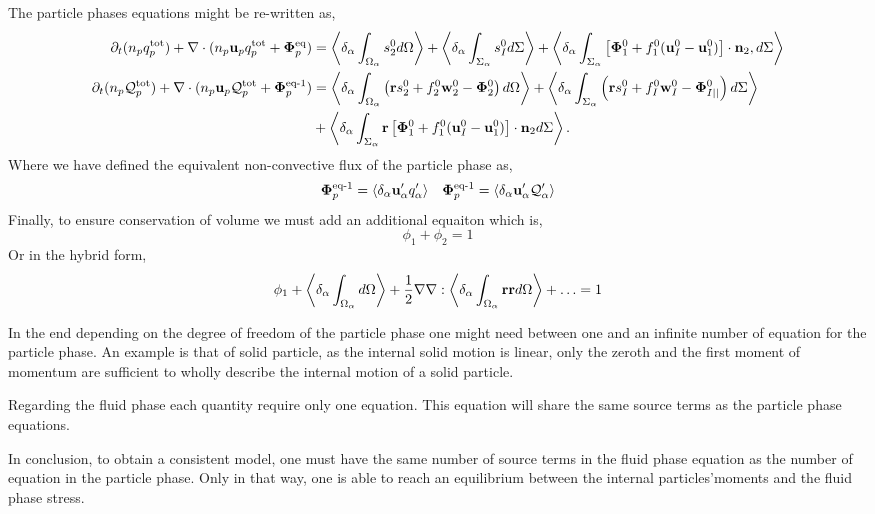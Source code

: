 The particle phases equations might be re-written as, 
\begin{align}
    \partial_t (n_p  q_p^\text{tot})
    + \mathbf{\nabla}\cdot (n_p\textbf{u}_p q_p^\text{tot} + \bm\Phi_p^\text{eq})
    &= \left<\delta_\alpha \int_{\Omega_\alpha}  s_2^0  d\Omega\right>
    + \left<\delta_\alpha \int_{\Sigma_\alpha}  s_I^0  d\Sigma\right>
    + \left<\delta_\alpha \int_{\Sigma_\alpha}  \left[\mathbf{\Phi}_1^0 + f_1^0 (\textbf{u}_I^0-\textbf{u}_1^0) \right] \cdot \textbf{n}_2 , d\Sigma\right>
    \\
    \partial_t (n_p  \mathcal{Q}_p^\text{tot})
    + \mathbf{\nabla}\cdot (n_p \textbf{u}_p\mathcal{Q}_p^\text{tot}
    + \bm\Phi_p^\text{eq-1})
    &=\left<\delta_\alpha \int_{\Omega_\alpha}  \left(
        \textbf{r} s_2^0         
        + f_2^0  \textbf{w}_2^0 
        - \mathbf{\Phi}_2^0
    \right)  d\Omega\right>
    + \left<\delta_\alpha \int_{\Sigma_\alpha}  \left(
        \textbf{r}s_I^0
        + f_I^0 \textbf{w}_I^0
        - \mathbf{\Phi}_{I||}^0
    \right)  d\Sigma\right>\nonumber\\
    &+ \left<\delta_\alpha \int_{\Sigma_\alpha}  \textbf{r} \left[
        \mathbf{\Phi}_1^0
        + f_1^0 (\textbf{u}_I^0-\textbf{u}_1^0)
    \right]\cdot \textbf{n}_2   d\Sigma\right>.
\end{align}
Where we have defined the equivalent non-convective flux of the particle phase as, 
\begin{align*}
    \bm\Phi_p^\text{eq-1}= \left<\delta_\alpha \textbf{u}_\alpha' q_\alpha'\right>
    && \bm\Phi_p^\text{eq-1}= \left<\delta_\alpha \textbf{u}_\alpha' \mathcal{Q}_\alpha'\right>
\end{align*}
Finally, to ensure conservation of volume we must add an additional equaiton which is, 
\begin{equation}
    \phi_1 + \phi_2 = 1
\end{equation}
Or in the hybrid form, 
\begin{equation}
    \phi_1 + \left<\delta_\alpha \int_{\Omega_\alpha}  d\Omega\right> +\frac{1}{2} \mathbf{\nabla}\mathbf{\nabla} : \left<\delta_\alpha \int_{\Omega_\alpha} \textbf{rr} d\Omega\right> + \ldots = 1
\end{equation}



In the end depending on the degree of freedom of the particle phase one might need between one and an infinite number of equation for the particle phase. 
An example is that of solid particle, as the internal solid motion is linear, only the zeroth and the first moment of momentum are sufficient to wholly describe the internal motion of a solid particle. 

Regarding the fluid phase each quantity require only one equation. 
This equation will share the same source terms as the particle phase equations. 


In conclusion, to obtain a consistent model, one must have the same number of source terms in the fluid phase equation as the number of equation in the particle phase. 
Only in that way, one is able to reach an equilibrium between the internal particles'moments and the fluid phase stress. 